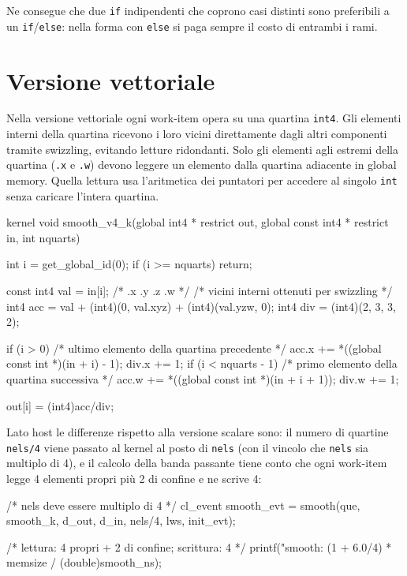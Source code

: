 Ne consegue che due \texttt{if} indipendenti che coprono casi distinti sono preferibili a un \texttt{if}/\texttt{else}: nella forma con \texttt{else} si paga sempre il costo di entrambi i rami.

\section{Versione vettoriale}\label{sec:opencl_lmem_smooth_v4}

Nella versione vettoriale ogni work-item opera su una quartina \texttt{int4}. Gli elementi interni della quartina ricevono i loro vicini direttamente dagli altri componenti tramite swizzling, evitando letture ridondanti. Solo gli elementi agli estremi della quartina (\texttt{.x} e \texttt{.w}) devono leggere un elemento dalla quartina adiacente in global memory. Quella lettura usa l'aritmetica dei puntatori per accedere al singolo \texttt{int} senza caricare l'intera quartina.

\begin{code}[caption={Kernel smooth vettoriale con \texttt{int4}}, label={code:smooth_v4_k}]
kernel void smooth_v4_k(global int4 * restrict out,
                        global const int4 * restrict in, int nquarts)
{
    int i = get_global_id(0);
    if (i >= nquarts) return;

    const int4 val = in[i]; /* .x .y .z .w */
    /* vicini interni ottenuti per swizzling */
    int4 acc = val + (int4)(0, val.xyz) + (int4)(val.yzw, 0);
    int4 div = (int4)(2, 3, 3, 2);

    if (i > 0) {
        /* ultimo elemento della quartina precedente */
        acc.x += *((global const int *)(in + i) - 1);
        div.x += 1;
    }
    if (i < nquarts - 1) {
        /* primo elemento della quartina successiva */
        acc.w += *((global const int *)(in + i + 1));
        div.w += 1;
    }

    out[i] = (int4)acc/div;
}
\end{code}

Lato host le differenze rispetto alla versione scalare sono: il numero di quartine \texttt{nels/4} viene passato al kernel al posto di \texttt{nels} (con il vincolo che \texttt{nels} sia multiplo di 4), e il calcolo della banda passante tiene conto che ogni work-item legge 4 elementi propri più 2 di confine e ne scrive 4:

\begin{code}[caption={Differenze host per la versione vettoriale}, label={code:smooth_host_v4}]
/* nels deve essere multiplo di 4 */
cl_event smooth_evt = smooth(que, smooth_k, d_out, d_in,
                              nels/4, lws, init_evt);

/* lettura: 4 propri + 2 di confine; scrittura: 4 */
printf("smooth: %
       (1 + 6.0/4) * memsize / (double)smooth_ns);
\end{code}


